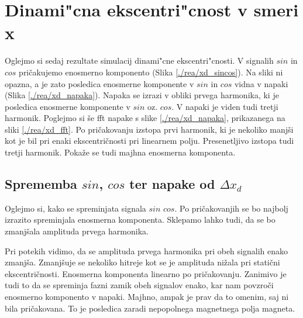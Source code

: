 \section{Dinami"cna ekscentri"cnost v smeri x}
%
Oglejmo si sedaj rezultate simulacij dinami"cne ekscentri"cnosti. V signalih $sin$ in $cos$ pričakujemo enosmerno komponento (Slika \ref{./rea/xd_sincos}). Na sliki ni opazna, a je zato posledica enosmerne komponente v $sin$ in $cos$ vidna v napaki (Slika \ref{./rea/xd_napaka}). Napaka se izrazi v obliki prvega harmonika, ki je posledica enosmerne komponente v $sin$ oz. $cos$. V napaki je viden tudi tretji harmonik. Poglejmo si še fft napake s slike \ref{./rea/xd_napaka}, prikazanega na sliki \ref{./rea/xd_fft}.  Po pričakovanju izstopa prvi harmonik, ki je nekoliko manjši kot je bil pri enaki ekscentričnosti pri linearnem polju. Presenetljivo izstopa tudi tretji harmonik. Pokaže se tudi majhna enosmerna komponenta.



\newpage
\subsection{Sprememba $sin$, $cos$ ter napake od $\Delta x_d$}

Oglejmo si, kako se spreminjata signala $sin$ $cos$. Po pričakovanjih se bo najbolj izrazito spreminjala enosmerna komponenta. Sklepamo lahko tudi, da se bo zmanjšala amplituda prvega harmonika.

Pri potekih vidimo, da se amplituda prvega harmonika pri obeh signalih enako zmanjša. Zmanjšuje se nekoliko hitreje kot se je amplituda nižala pri statični ekscentričnosti. Enosmerna komponenta linearno po pričakovanju. Zanimivo je tudi to da se spreminja fazni zamik obeh signalov enako, kar nam povzroči enosmerno komponento v napaki. Majhno, ampak je prav da to omenim, saj ni bila pričakovana.  To je posledica zaradi nepopolnega magnetnega polja magneta.


